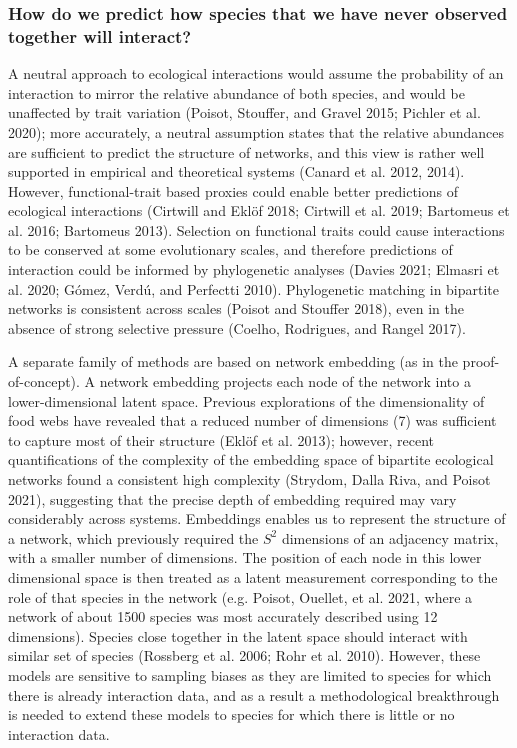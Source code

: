 \documentclass[11pt]{article}
\begin{document}
\hypertarget{how-do-we-predict-how-species-that-we-have-never-observed-together-will-interact}{%
\subsubsection{How do we predict how species that we have never observed
together will
interact?}\label{how-do-we-predict-how-species-that-we-have-never-observed-together-will-interact}}

A neutral approach to ecological interactions would assume the
probability of an interaction to mirror the relative abundance of both
species, and would be unaffected by trait variation (Poisot, Stouffer,
and Gravel 2015; Pichler et al. 2020); more accurately, a neutral
assumption states that the relative abundances are sufficient to predict
the structure of networks, and this view is rather well supported in
empirical and theoretical systems (Canard et al. 2012, 2014). However,
functional-trait based proxies could enable better predictions of
ecological interactions (Cirtwill and Eklöf 2018; Cirtwill et al. 2019;
Bartomeus et al. 2016; Bartomeus 2013). Selection on functional traits
could cause interactions to be conserved at some evolutionary scales,
and therefore predictions of interaction could be informed by
phylogenetic analyses (Davies 2021; Elmasri et al. 2020; Gómez, Verdú,
and Perfectti 2010). Phylogenetic matching in bipartite networks is
consistent across scales (Poisot and Stouffer 2018), even in the absence
of strong selective pressure (Coelho, Rodrigues, and Rangel 2017).

A separate family of methods are based on network embedding (as in the
proof-of-concept). A network embedding projects each node of the network
into a lower-dimensional latent space. Previous explorations of the
dimensionality of food webs have revealed that a reduced number of
dimensions (7) was sufficient to capture most of their structure (Eklöf
et al. 2013); however, recent quantifications of the complexity of the
embedding space of bipartite ecological networks found a consistent high
complexity (Strydom, Dalla Riva, and Poisot 2021), suggesting that the
precise depth of embedding required may vary considerably across
systems. Embeddings enables us to represent the structure of a network,
which previously required the \(S^2\) dimensions of an adjacency matrix,
with a smaller number of dimensions. The position of each node in this
lower dimensional space is then treated as a latent measurement
corresponding to the role of that species in the network (e.g. Poisot,
Ouellet, et al. 2021, where a network of about 1500 species was most
accurately described using 12 dimensions). Species close together in the
latent space should interact with similar set of species (Rossberg et
al. 2006; Rohr et al. 2010). However, these models are sensitive to
sampling biases as they are limited to species for which there is
already interaction data, and as a result a methodological breakthrough
is needed to extend these models to species for which there is little or
no interaction data.
\end{document}
